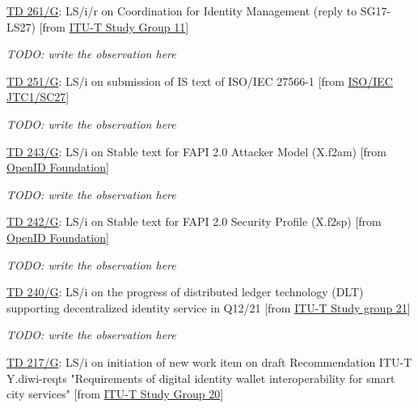 \href{https://www.itu.int/md/meetingdoc.asp?lang=en\&parent=T25-SG17-251203-TD-GEN-0261}{TD 261/G}: LS/i/r on Coordination for Identity Management (reply to SG17-LS27)  [from \href{https://www.itu.int/md/meetingdoc.asp?lang=en\&parent=T25-SG17-251203-TD-GEN\&question=Q10/17\&source=ITU-T\%20Study\%20Group\%2011}{ITU-T Study Group 11}]

\textit{TODO: write the observation here}

\href{https://www.itu.int/md/meetingdoc.asp?lang=en\&parent=T25-SG17-251203-TD-GEN-0251}{TD 251/G}: LS/i on submission of IS text of ISO/IEC 27566-1  [from \href{https://www.itu.int/md/meetingdoc.asp?lang=en\&parent=T25-SG17-251203-TD-GEN\&question=Q10/17\&source=ISO/IEC\%20JTC1/SC27}{ISO/IEC JTC1/SC27}]

\textit{TODO: write the observation here}

\href{https://www.itu.int/md/meetingdoc.asp?lang=en\&parent=T25-SG17-251203-TD-GEN-0243}{TD 243/G}: LS/i on Stable text for FAPI 2.0 Attacker Model (X.f2am)   [from \href{https://www.itu.int/md/meetingdoc.asp?lang=en\&parent=T25-SG17-251203-TD-GEN\&question=Q10/17\&source=OpenID\%20Foundation}{OpenID Foundation}]

\textit{TODO: write the observation here}

\href{https://www.itu.int/md/meetingdoc.asp?lang=en\&parent=T25-SG17-251203-TD-GEN-0242}{TD 242/G}: LS/i on Stable text for FAPI 2.0 Security Profile (X.f2sp)  [from \href{https://www.itu.int/md/meetingdoc.asp?lang=en\&parent=T25-SG17-251203-TD-GEN\&question=Q10/17\&source=OpenID\%20Foundation}{OpenID Foundation}]

\textit{TODO: write the observation here}

\href{https://www.itu.int/md/meetingdoc.asp?lang=en\&parent=T25-SG17-251203-TD-GEN-0240}{TD 240/G}: LS/i on the progress of distributed ledger technology (DLT) supporting decentralized identity service in Q12/21  [from \href{https://www.itu.int/md/meetingdoc.asp?lang=en\&parent=T25-SG17-251203-TD-GEN\&question=Q10/17\&source=ITU-T\%20Study\%20group\%2021}{ITU-T Study group 21}]

\textit{TODO: write the observation here}

\href{https://www.itu.int/md/meetingdoc.asp?lang=en\&parent=T25-SG17-251203-TD-GEN-0217}{TD 217/G}: LS/i on initiation of new work item on draft Recommendation ITU-T Y.diwi-reqts "Requirements of digital identity wallet interoperability for smart city services"  [from \href{https://www.itu.int/md/meetingdoc.asp?lang=en\&parent=T25-SG17-251203-TD-GEN\&question=Q10/17\&source=ITU-T\%20Study\%20Group\%2020}{ITU-T Study Group 20}]

